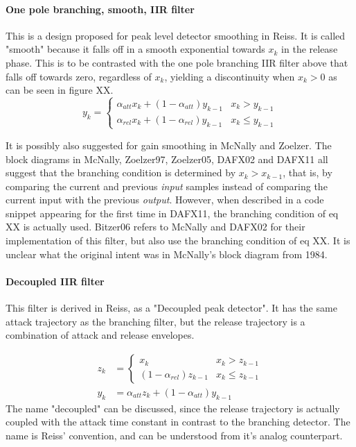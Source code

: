 \documentclass[../main2.tex]{subfiles}
\begin{document}
\paragraph{One pole branching, smooth, IIR filter}
This is a design proposed for peak level detector smoothing in Reiss. It is called "smooth" because it falls off in a smooth exponential towards $x_k$ in the release phase. This is to be contrasted with the one pole branching IIR filter above that falls off towards zero, regardless of $x_k$, yielding a discontinuity when $x_k > 0$ as can be seen in figure XX.
\begin{equation}
y_k = \begin{cases}
    \alpha_{att} x_k + (1-\alpha_{att}) y_{k-1} 	& x_k > y_{k-1} \\
    \alpha_{rel} x_k + (1-\alpha_{rel}) y_{k-1} 	& x_k \leq y_{k-1}
\end{cases}
\end{equation}

It is possibly also suggested for gain smoothing in McNally and Zoelzer. The block diagrams in McNally, Zoelzer97, Zoelzer05, DAFX02 and DAFX11 all suggest that the branching condition is determined by $x_k > x_{k-1}$, that is, by comparing the current and previous \emph{input} samples instead of comparing the current input with the previous \emph{output}. However, when described in a code snippet appearing for the first time in DAFX11, the branching condition of eq XX is actually used. Bitzer06 refers to McNally and DAFX02 for their implementation of this filter, but also use the branching condition of eq XX. It is unclear what the original intent was in McNally's block diagram from 1984.

\paragraph{Decoupled IIR filter}
This filter is derived in Reiss, as a "Decoupled peak detector". It has the same attack trajectory as the branching filter, but the release trajectory is a combination of attack and release envelopes.

\begin{equation}
\begin{split}
z_k &= \begin{cases}
    x_k 								& x_k > z_{k-1} \\
   (1-\alpha_{rel}) z_{k-1} 					& x_k \leq z_{k-1}
\end{cases} \\
y_k &= \alpha_{att} z_k + (1-\alpha_{att}) y_{k-1}
\end{split}
\end{equation}
The name "decoupled" can be discussed, since the release trajectory is actually coupled with the attack time constant in contrast to the branching detector. The name is Reiss' convention, and can be understood from it's analog counterpart.
\end{document}
